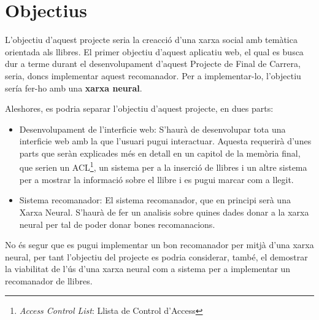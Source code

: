 \chapter{Objectius}

L'objectiu d'aquest projecte seria la creacció d'una xarxa social amb temàtica orientada als llibres. El primer objectiu d'aquest aplicatiu web, el qual es busca dur a terme durant el desenvolupament d'aquest Projecte de Final de Carrera, seria, doncs implementar aquest recomanador. Per a implementar-lo, l'objectiu sería fer-ho amb una {\bf xarxa neural}.

Aleshores, es podria separar l'objectiu d'aquest projecte, en dues parts:

\begin{itemize}
\item Desenvolupament de l'interficie web: S'haurà de desenvolupar tota una interficie web amb la que l'usuari pugui interactuar. Aquesta requerirà d'unes parts que seràn explicades més en detall en un capitol de la memòria final, que serien un ACL\footnote{\textit{Access Control List}: Llista de Control d'Access}, un sistema per a la inserció de llibres i un altre sistema per a mostrar la informació sobre el llibre i es pugui marcar com a llegit.
\item Sistema recomanador: El sistema recomanador, que en principi serà una Xarxa Neural. S'haurà de fer un analisis sobre quines dades donar a la xarxa neural per tal de poder donar bones recomanacions.
\end{itemize}

No és segur que es pugui implementar un bon recomanador per mitjà d'una xarxa neural, per tant l'objectiu del projecte es podria considerar, també, el demostrar la viabilitat de l'ús d'una xarxa neural com a sistema per a implementar un recomanador de llibres.